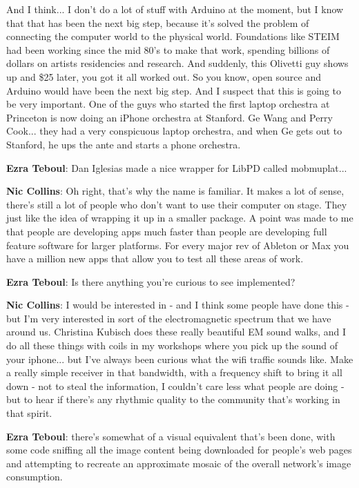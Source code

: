 And I think... I don’t do a lot of stuff with Arduino at the moment, but I know that that has been the next big step, because it’s solved the problem of connecting the computer world to the physical world. Foundations like STEIM had been working since the mid 80’s to make that work, spending billions of dollars on artists residencies and research. And suddenly, this Olivetti guy shows up and \$25 later, you got it all worked out. So you know, open source and Arduino would have been the next big step. And I suspect that this is going to be very important. One of the guys who started the first laptop orchestra at Princeton is now doing an iPhone orchestra at Stanford. Ge Wang and Perry Cook... they had a very conspicuous laptop orchestra, and when Ge gets out to Stanford, he ups the ante and starts a phone orchestra.
					
\textbf{Ezra Teboul}: Dan Iglesias made a nice wrapper for LibPD called mobmuplat...
					
\textbf{Nic Collins}: Oh right, that’s why the name is familiar. It makes a lot of sense, there’s still a lot of people who don’t want to use their computer on stage. They just like the idea of wrapping it up in a smaller package. A point was made to me that people are developing apps much faster than people are developing full feature software for larger platforms. For every major rev of Ableton or Max you have a million new apps that allow you to test all these areas of work.
					
\textbf{Ezra Teboul}: Is there anything you’re curious to see implemented? 
					
\textbf{Nic Collins}: I would be interested in - and I think some people have done this - but I’m very interested in sort of the electromagnetic spectrum that we have around us. Christina Kubisch does these really beautiful EM sound walks, and I do all these things with coils in my workshops where you pick up the sound of your iphone... but I’ve always been curious what the wifi traffic sounds like. Make a really simple receiver in that bandwidth, with a frequency shift to bring it all down - not to steal the information, I couldn’t care less what people are doing - but to hear if there’s any rhythmic quality to the community that’s working in that spirit.
					
\textbf{Ezra Teboul}: there’s somewhat of a visual equivalent that’s been done, with some code sniffing all the image content being downloaded for people’s web pages and attempting to recreate an approximate mosaic of the overall network’s image consumption.
					
